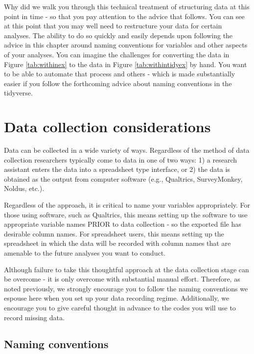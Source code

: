 \documentclass[
]{krantz}
\begin{document}
Why did we walk you through this technical treatment of structuring data at this point in time - so that you pay attention to the advice that follows. You can see at this point that you may well need to restructure your data for certain analyses. The ability to do so quickly and easily depends upon following the advice in this chapter around naming conventions for variables and other aspects of your analyses. You can imagine the challenges for converting the data in Figure \ref{tab:withinex} to the data in Figure \ref{tab:withintidyex} by hand. You want to be able to automate that process and others - which is made substantially easier if you follow the forthcoming advice about naming conventions in the tidyverse.

\hypertarget{data-collection-considerations}{%
\section{Data collection considerations}\label{data-collection-considerations}}

Data can be collected in a wide variety of ways. Regardless of the method of data collection researchers typically come to data in one of two ways: 1) a research assistant enters the data into a spreadsheet type interface, or 2) the data is obtained as the output from computer software (e.g., Qualtrics, SurveyMonkey, Noldus, etc.).

Regardless of the approach, it is critical to name your variables appropriately. For those using software, such as Qualtrics, this means setting up the software to use appropriate variable names PRIOR to data collection - so the exported file has desirable column names. For spreadsheet users, this means setting up the spreadsheet in which the data will be recorded with column names that are amenable to the future analyses you want to conduct.

Although failure to take this thoughtful approach at the data collection stage can be overcome - it is only overcome with substantial manual effort. Therefore, as noted previously, we strongly encourage you to follow the naming conventions we espouse here when you set up your data recording regime. Additionally, we encourage you to give careful thought in advance to the codes you will use to record missing data.

\hypertarget{naming-conventions}{%
\subsection{Naming conventions}\label{naming-conventions}}
\end{document}
